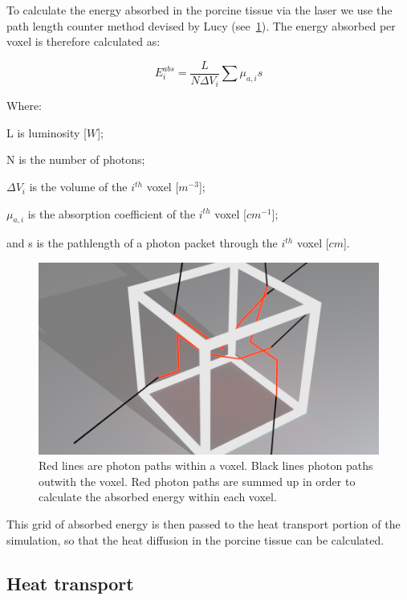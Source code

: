 To calculate the energy absorbed in the porcine tissue via the laser we use the path length counter method devised by Lucy \cite{lucy1999computing} (see~\cref{fig:jmea-explain}). The energy absorbed per voxel is therefore calculated as:

\begin{equation}
E_{i}^{abs} = \frac{L}{N \Delta V_i}\sum\mu_{a,i} s
\label{eqn:Eabs}
\end{equation}

\noindent Where:

	\indent L is luminosity [$W$];
	
	\indent N is the number of photons;
	
	\indent $\Delta V_i$ is the volume of the $i^{th}$ voxel [$m^{-3}$];
	
	\indent $\mu_{a,i}$ is the absorption coefficient of the $i^{th}$ voxel [$cm^{-1}$];
	
	\indent and s is the pathlength of a photon packet through the $i^{th}$ voxel [$cm$].
	
	\medskip
	
\begin{figure}
\centering
\includegraphics[scale=0.25]{./ablation/images/jmea-explain.png}
\caption{Red lines are photon paths within a voxel. Black lines photon paths outwith the voxel. Red photon paths are summed up in order to calculate the absorbed energy within each voxel.}
\label{fig:jmea-explain}
\end{figure}	
		
This grid of absorbed energy is then passed to the heat transport portion of the simulation, so that the heat diffusion in the porcine tissue can be calculated.
\newpage
\subsection{Heat transport}

